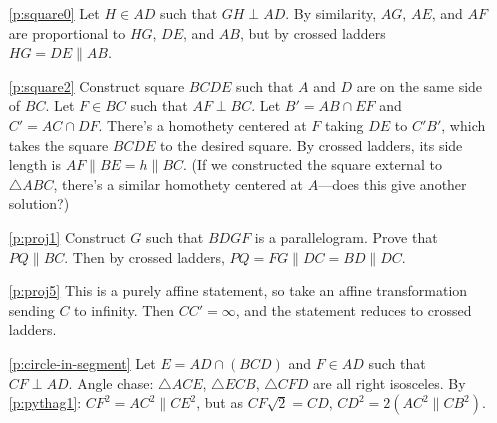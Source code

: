 \documentclass[11pt,paper=letter]{scrartcl}
\newcommand{\pl}{\parallel}
\begin{document}
\begin{enumerate}
\item[\ref{p:square0}] Let $H \in AD$ such that $GH \perp AD$. By similarity, $AG$, $AE$, and $AF$ are proportional to $HG$, $DE$, and $AB$, but by crossed ladders $HG = DE \pl AB$.

\item[\ref{p:square2}] Construct square $BCDE$ such that $A$ and $D$ are on the same side of $BC$. Let $F \in BC$ such that $AF \perp BC$. Let $B' = AB \cap EF$ and $C' = AC \cap DF$. There's a homothety centered at $F$ taking $DE$ to $C'B'$, which takes the square $BCDE$ to the desired square. By crossed ladders, its side length is $AF \pl BE = h \pl BC$. (If we constructed the square external to $\triangle ABC$, there's a similar homothety centered at $A$---does this give another solution?)

\item[\ref{p:proj1}] Construct $G$ such that $BDGF$ is a parallelogram. Prove that $PQ \pl BC$. Then by crossed ladders, $PQ = FG \pl DC = BD \pl DC$.

\item[\ref{p:proj5}] This is a purely affine statement, so take an affine transformation sending $C$ to infinity. Then $CC' = \infty$, and the statement reduces to crossed ladders.

\item[\ref{p:circle-in-segment}] Let $E = AD \cap (BCD)$ and $F \in AD$ such that $CF \perp AD$. Angle chase: $\triangle ACE$, $\triangle ECB$, $\triangle CFD$ are all right isosceles. By \ref{p:pythag1}: $CF^2 = AC^2 \pl CE^2$, but as $CF\sqrt{2} = CD$, $CD^2 = 2(AC^2 \pl CB^2)$.
\end{enumerate}
\end{document}

